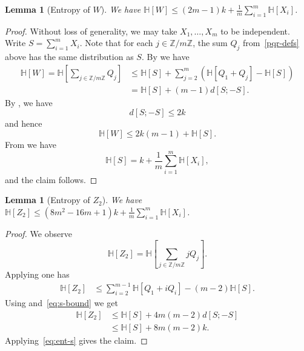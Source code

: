 \documentclass[10pt,a4paper]{article}
\newtheorem{lemma}[theorem]{Lemma}
\newcommand{\lean}[1]{}
\newcommand{\uses}[1]{}
\newcommand{\leanok}{}
\newcommand{\Z}{\mathbb{Z}}
\newcommand{\bbH}{\mathbb{H}}
\begin{document}
\begin{lemma}[Entropy of $W$]\label{ent-w}\lean{entropy_of_W_le}\uses{more-random}\leanok  We have $\bbH[W] \leq (2m-1)k + \frac1m \sum_{i=1}^m \bbH[X_i]$.
\end{lemma}

\begin{proof}\uses{multidist-def, multidist-ruzsa-IV, klm-1}\leanok Without loss of generality, we may take $X_1,\dots,X_m$ to be independent. Write $S = \sum_{i=1}^m X_i$.
  Note that for each $j \in \Z/m\Z$, the sum $Q_j$ from~\eqref{pqr-defs} above has the same distribution as $S$.
  By  we have
  \begin{align*}
    \bbH[W] = \bbH[\sum_{j \in \Z/m\Z} Q_j]  & \leq \bbH[S] + \sum_{j=2}^m (\bbH[Q_1+Q_j] - \bbH[S]) \\ & = \bbH[S] + (m-1) d[S;-S].
  \end{align*}
  By , we have
  \begin{equation}
    \label{eq:s-bound}
    d[S; -S] \leq 2 k
  \end{equation}
  and hence
  \[
    \bbH[W] \leq 2 k (m-1) + \bbH[S].
  \]
  From  we have
  \begin{equation}
    \label{eq:ent-s}
    \bbH[S] = k + \frac1m \sum_{i=1}^m \bbH[X_i],
  \end{equation}
  and the claim follows.
\end{proof}

\begin{lemma}[Entropy of $Z_2$]\label{ent-z2}\lean{entropy_of_Z_two_le}\uses{more-random}\leanok  We have $\bbH[Z_2] \leq (8m^2-16m+1) k + \frac{1}{m} \sum_{i=1}^m \bbH[X_i]$.
\end{lemma}

\begin{proof}\uses{sum-dilate-II, klm-1}\leanok
  We observe
  \[
    \bbH[Z_2] = \bbH[\sum_{j \in \Z/m\Z} j Q_j].
  \]
  Applying  one has
  \begin{align*}
    \bbH[Z_2] &\leq \sum_{i=2}^{m-1} \bbH[Q_1 + i Q_i]  - (m-2) \bbH[S].
  \end{align*}
  Using  and~\eqref{eq:s-bound} we get
  \begin{align*}
    \bbH[Z_2]
              &\leq \bbH[S] + 4m (m-2) d[S;-S] \\
              &\leq \bbH[S] + 8m (m-2) k.
  \end{align*}
  Applying~\eqref{eq:ent-s} gives the claim.
\end{proof}
\end{document}
